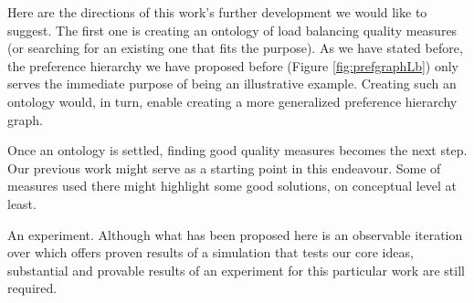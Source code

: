 Here are the directions of this work's further development we would like to suggest.
The first one is creating an ontology of load balancing quality measures (or searching for an existing one that fits the purpose).
As we have stated before, the preference hierarchy we have proposed before (Figure \ref{fig:prefgraphLb}) only serves the immediate purpose of being an illustrative example.
Creating such an ontology would, in turn, enable creating a more generalized preference hierarchy graph.

Once an ontology is settled, finding good quality measures becomes the next step.
Our previous work \cite{murashov-2022} might serve as a starting point in this endeavour.
Some of measures used there might highlight some good solutions, on conceptual level at least.

An experiment.
Although what has been proposed here is an observable iteration over \cite{murashov-2022} which offers proven results of a simulation that tests our core ideas, substantial and provable results of an experiment for this particular work are still required.
